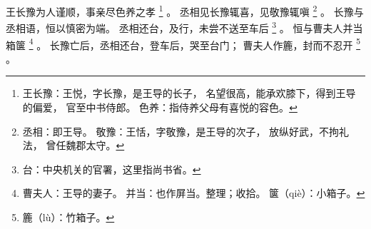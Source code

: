 
\switchcolumn*[\section{}]

王长豫为人谨顺，事亲尽色养之孝%
\footnote{%
    王长豫：王悦，字长豫，是王导的长子，
            名望很高，能承欢膝下，得到王导的偏爱，
            官至中书侍郎。
    色养：指侍养父母有喜悦的容色。
}%
。
丞相见长豫辄喜，见敬豫辄嗔%
\footnote{%
    丞相：即王导。
    敬豫：王恬，字敬豫，是王导的次子，
          放纵好武，不拘礼法，
          曾任魏郡太守。
}%
。
长豫与丞相语，恒以慎密为端。
丞相还台，及行，未尝不送至车后%
\footnote{%
    台：中央机关的官署，这里指尚书省。
}%
。
恒与曹夫人并当箱箧%
\footnote{%
    曹夫人：王导的妻子。
    并当：也作屏当。整理；收拾。
    箧（qiè）：小箱子。
}%
。
长豫亡后，丞相还台，登车后，哭至台门；
曹夫人作簏，封而不忍开%
\footnote{%
    簏（lù）：竹箱子。
}%
。

\switchcolumn



